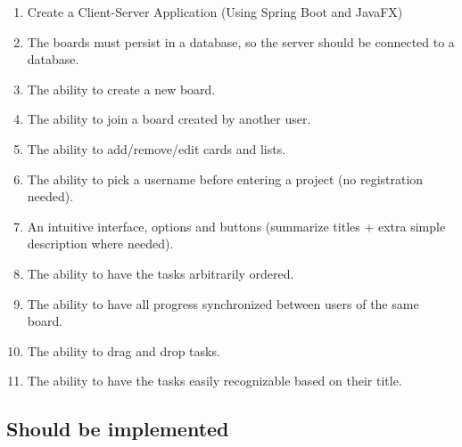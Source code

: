 \documentclass{article}
\begin{document}
	\begin{enumerate}
		\item Create a Client-Server Application (Using Spring Boot and JavaFX)
		\item The boards must persist in a database, so the server should be connected to a database.
		\item The ability to create a new board.
		\item The ability to join a board created by another user.
		\item The ability to add/remove/edit cards and lists.
		\item The ability to pick a username before entering a project (no registration needed).
		\item An intuitive interface, options and buttons (summarize titles + extra simple description where needed).
		\item The ability to have the tasks arbitrarily ordered.
		\item The ability to have all progress synchronized between users of the same board.
		\item The ability to drag and drop tasks.
		\item The ability to have the tasks easily recognizable based on their title.
	\end{enumerate}

	\subsection{Should be implemented}
\end{document}
